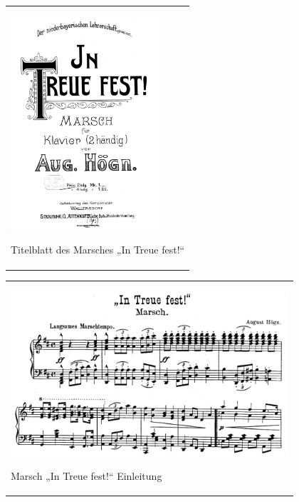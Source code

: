 \begin{center}
\begin{minipage}{5.884cm}
\begin{flushleft}
\tablefirsthead{}
\tablehead{}
\tabletail{}
\tablelasttail{}
\begin{supertabular}{m{5.684cm}}

\includegraphics[width=5.503cm,height=7.862cm]{pictures/zulassungsarbeit-img104.png}

Titelblatt des Marsches „In Treue
fest!“\\
\end{supertabular}
\end{flushleft}
\end{minipage}
\end{center}
\begin{center}
\tablefirsthead{}
\tablehead{}
\tabletail{}
\tablelasttail{}
\begin{supertabular}{m{10.502cm}}

\includegraphics[width=10.319cm,height=6.071cm]{pictures/zulassungsarbeit-img105.png}

Marsch „In Treue fest!“ Einleitung\\
\end{supertabular}
\end{center}

